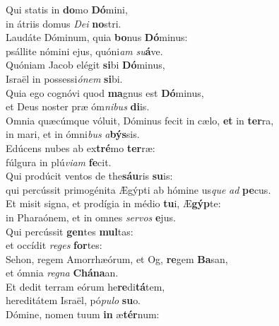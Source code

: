 \evenverse Qui statis in \textbf{do}mo \textbf{Dó}mini,~\*\\
\evenverse in átriis domus \textit{De}\textit{i} \textbf{no}stri.\\
\oddverse Laudáte Dóminum, quia \textbf{bo}nus \textbf{Dó}minus:~\*\\
\oddverse psállite nómini ejus, quóni\textit{am} \textit{su}\textbf{á}ve.\\
\evenverse Quóniam Jacob elégit \textbf{si}bi \textbf{Dó}minus,~\*\\
\evenverse Israël in possessi\textit{ó}\textit{nem} \textbf{si}bi.\\
\oddverse Quia ego cognóvi quod \textbf{ma}gnus est \textbf{Dó}minus,~\*\\
\oddverse et Deus noster præ óm\textit{ni}\textit{bus} \textbf{di}is.\\
\evenverse Omnia quæcúmque vóluit, Dóminus fecit in cælo, \textbf{et} in \textbf{ter}ra,~\*\\
\evenverse in mari, et in ómni\textit{bus} \textit{a}\textbf{býs}sis.\\
\oddverse Edúcens nubes ab ex\textbf{tré}mo \textbf{ter}ræ:~\*\\
\oddverse fúlgura in plú\textit{vi}\textit{am} \textbf{fe}cit.\\
\evenverse Qui prodúcit ventos de the\textbf{sáu}ris \textbf{su}is:~\*\\
\evenverse qui percússit primogénita Ægýpti ab hómine us\textit{que} \textit{ad} \textbf{pe}cus.\\
\oddverse Et misit signa, et prodígia in médio \textbf{tu}i, Æ\textbf{gýp}te:~\*\\
\oddverse in Pharaónem, et in omnes \textit{ser}\textit{vos} \textbf{e}jus.\\
\evenverse Qui percússit \textbf{gen}tes \textbf{mul}tas:~\*\\
\evenverse et occídit \textit{re}\textit{ges} \textbf{for}tes:\\
\oddverse Sehon, regem Amorrhæórum, et Og, \textbf{re}gem \textbf{Ba}san,~\*\\
\oddverse et ómnia \textit{re}\textit{gna} \textbf{Chá}\textbf{na}an.\\
\evenverse Et dedit terram eórum he\textbf{re}di\textbf{tá}tem,~\*\\
\evenverse hereditátem Israël, pó\textit{pu}\textit{lo} \textbf{su}o.\\
\oddverse Dómine, nomen tuum \textbf{in} æ\textbf{tér}num:~\*\\
